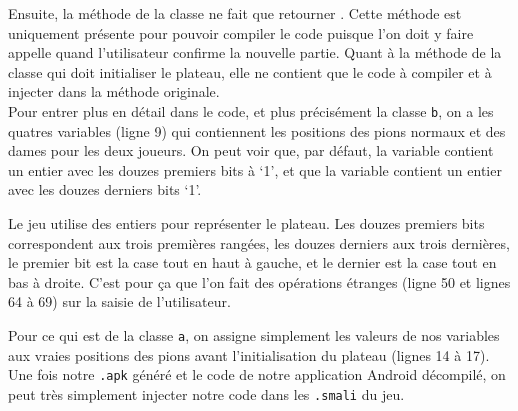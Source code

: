 Ensuite, la méthode  de la classe  ne fait que retourner . Cette méthode est uniquement présente pour pouvoir compiler le code puisque l'on doit y faire appelle quand l'utilisateur confirme la nouvelle partie. Quant à la méthode  de la classe  qui doit initialiser le plateau, elle ne contient que le code à compiler et à injecter dans la méthode originale.\\

Pour entrer plus en détail dans le code, et plus précisément la classe \texttt{b}, on a les quatres variables  (ligne 9) qui contiennent les positions des pions normaux et des dames pour les deux joueurs. On peut voir que, par défaut, la variable  contient un entier avec les douzes premiers bits à `1', et que la variable  contient un entier avec les douzes derniers bits `1'.

Le jeu utilise des entiers pour représenter le plateau. Les douzes premiers bits correspondent aux trois premières rangées, les douzes derniers aux trois dernières, le premier bit est la case tout en haut à gauche, et le dernier est la case tout en bas à droite. C'est pour ça que l'on fait des opérations étranges (ligne 50 et lignes 64 à 69) sur la saisie de l'utilisateur.

Pour ce qui est de la classe \texttt{a}, on assigne simplement les valeurs de nos variables aux vraies positions des pions avant l'initialisation du plateau (lignes 14 à 17).\\

Une fois notre \texttt{.apk} généré et le code de notre application Android décompilé, on peut très simplement injecter notre code dans les \texttt{.smali} du jeu.\\

